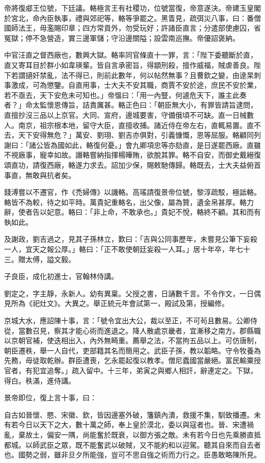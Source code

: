 \begin{pinyinscope}
帝將復郕王位號，下廷議。輅極言王有社稷功，位號當復，帝意遂決。帝建玉皇閣於宮北，命內臣執事，禮與郊祀等，輅等爭罷之。黑眚見，疏弭災八事，曰：番僧國師法王，毋濫賜印章；四方常貢外，勿受玩好；許諸臣直言；分遣部使慮囚，省冤獄；停不急營造，實三邊軍儲；守沿邊關隘；設雲南巡撫。帝優詔褒納。

中官汪直之督西廠也，數興大獄。輅率同官條直十一罪，言：「陛下委聽斷於直，直又寄耳目於群小如韋瑛輩。皆自言承密旨，得顓刑殺，擅作威福，賊虐善良。陛下若謂擿奸禁亂，法不得已，則前此數年，何以帖然無事？且曹欽之變，由逯杲刺事激成，可為懲鑒。自直用事，士大夫不安其職，商賈不安於途，庶民不安於業，若不亟去，天下安危未可知也。」帝慍曰：「用一內豎，何遽危天下，誰主此奏者？」命太監懷恩傳旨，詰責厲甚。輅正色曰：「朝臣無大小，有罪皆請旨逮問，直擅抄沒三品以上京官。大同、宣府，邊城要害，守備俄頃不可缺。直一日械數人。南京，祖宗根本地，留守大臣，直擅收捕。諸近侍在帝左右，直輒易置。直不去，天下安得無危？」萬安、劉珝、劉吉亦俱對，引義慷慨，恩等屈服。輅顧同列謝曰：「諸公皆為國如此，輅復何憂。」會九卿項忠等亦劾直，是日遂罷西廠。直雖不視廠事，寵幸如故。譖輅嘗納指揮楊曄賄，欲脫其罪。輅不自安，而御史戴縉復頌直功，請復西廠，輅遂力求去。詔加少保，賜敕馳傳歸。輅既去，士大夫益俯首事直，無敢與抗者矣。

錢溥嘗以不遷官，作《禿婦傳》以譏輅。高瑤請復景帝位號，黎淳疏駁，極詆輅。輅皆不為較，待之如平時。萬貴妃重輅名，出父像，屬為贊，遺金帛甚厚。輅力辭，使者告以妃意。輅曰：「非上命，不敢承也。」貴妃不悅，輅終不顧。其和而有執如此。

及謝政，劉吉過之，見其子孫林立，歎曰：「吉與公同事歷年，未嘗見公筆下妄殺一人，宜天之報公厚。」輅曰：「正不敢使朝廷妄殺一人耳。」居十年卒，年七十三。贈太傅，謚文毅。

子良臣，成化初進士，官翰林侍講。

劉定之，字主靜，永新人。幼有異稟。父授之書，日誦數千言。不令作文，一日偶見所為《祀灶文》。大異之。舉正統元年會試第一，殿試及第，授編修。

京城大水，應詔陳十事，言：「號令宜出大公，裁以至正，不可茍且數易。公卿侍從，當數召見，察其才能心術而進退之。降人散處京畿者，宜漸移之南方。郡縣職以京朝官補，使迭相出入，內外無畸重。薦舉之法，不當拘五品以上。可仿唐制，朝臣遷秩，舉一人自代，吏部籍其名而簡用之。武臣子孫，教以韜略。守令牧養為先務，毋徒取乾辦。群臣遭喪，乞永罷起復以教孝。僧尼蠹國當嚴絕。富民輸粟授官者，有犯宜追奪。」疏入留中。十三年，弟寅之與鄉人相訐，辭連定之。下獄，得白。秩滿，進侍講。

景帝即位，復上言十事，曰：

自古如晉懷、愍、宋徽、欽，皆因邊塞外破，籓鎮內潰，救援不集，馴致播遷。未有若今日以天下之大，數十萬之師，奉上皇於漠北，委以與寇者也。晉、宋遭禍亂，棄故土，偏安一隅，尚能奮於既衰，以御方張之敵。未有若今日也先乘勝直抵都城。以師武臣之眾，既不能奮武以破賊，又不能約和以迎駕。聽其自來而自去者也。國勢之弱，雖非旦夕所能強，豈可不思自強之術而力行之。臣愚敢略陳所見。


\end{pinyinscope}
